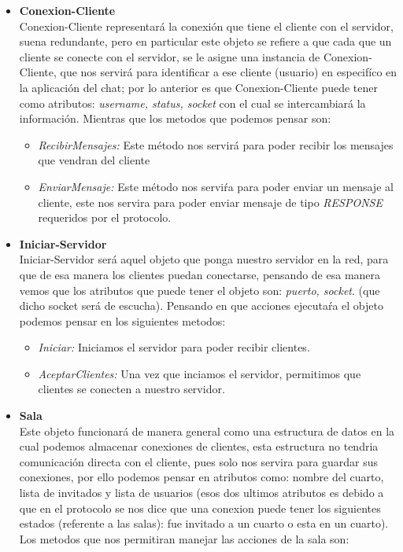 \documentclass[10pt,letterpaper]{report}
\begin{document}
\vspace{0.2cm}

    \begin{itemize}
        \item[-] \textbf{Conexion-Cliente}\\
        \noindent Conexion-Cliente representará la conexión que tiene el cliente con el servidor, suena redundante, pero en particular este objeto se refiere a que cada que un cliente se conecte con el servidor, se le asigne una instancia de Conexion-Cliente, que nos servirá para identificar a ese cliente (usuario) en especifíco en la aplicación del chat; por lo anterior es que Conexion-Cliente puede tener como atributos: \textit{username, status, socket} con el cual se intercambiará la información. Mientras que los metodos que podemos pensar son: 
                    \begin{itemize}
                \item[-] {\textit{RecibirMensajes:}} Este método nos servirá para poder recibir los mensajes que vendran del cliente
                \item[-] {\textit{EnviarMensaje:}} Este método nos serviŕa para poder enviar un mensaje al cliente, este nos servira para poder enviar mensaje de tipo \textit{RESPONSE} requeridos por el protocolo.
            \end{itemize}
        \item[-] \textbf{Iniciar-Servidor}\\
        \noindent Iniciar-Servidor será aquel objeto que ponga nuestro servidor en la red, para que de esa manera los clientes puedan conectarse, pensando de esa manera vemos que los atributos que puede tener el objeto son: \textit{puerto, socket}. (que dicho socket será de escucha).
        Pensando en que acciones ejecutaŕa el objeto podemos pensar en los siguientes metodos:
            \begin{itemize}
                \item[-] {\textit{Iniciar:}} Iniciamos el servidor para poder recibir clientes.
                \item[-] {\textit{AceptarClientes:}} Una vez que inciamos el servidor, permitimos que clientes se conecten a nuestro servidor.
            \end{itemize}
            
        \item[-] \textbf{Sala}\\
        \noindent Este objeto funcionará de manera general como una estructura de datos en la cual podemos almacenar conexiones de clientes, esta estructura no tendria comunicación directa con el cliente, pues solo nos servira para guardar sus conexiones, por ello podemos pensar en atributos como: 
        nombre del cuarto, lista de invitados y lista de usuarios (esos dos ultimos atributos es debido a que en el protocolo se nos dice que una conexion puede tener los siguientes estados (referente a las salas): fue invitado a un cuarto o esta en un cuarto). Los metodos que nos permitiran manejar las acciones de la sala son:


\end{itemize}
\end{document}
